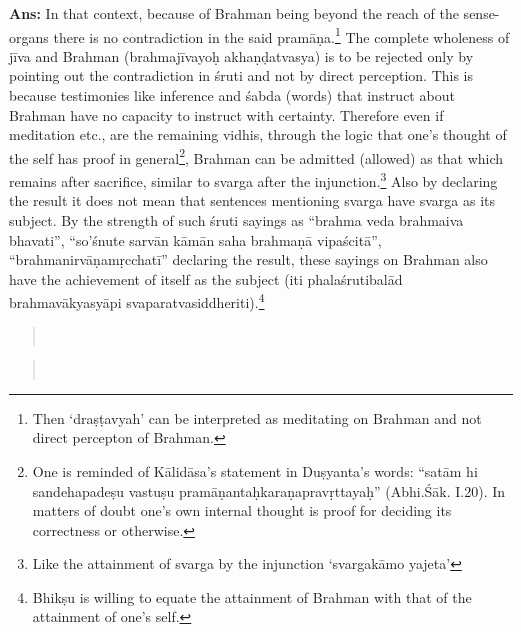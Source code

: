 \textbf{Ans:} In that context, because of Brahman being beyond the reach of the sense-organs there is no contradiction in the said pramāṇa.\footnote{Then ‘draṣṭavyah’ can be interpreted as meditating on Brahman and not direct percepton of Brahman.} The complete wholeness of jīva and Brahman (brahmajīvayoḥ akhaṇḍatvasya) is to be rejected only by pointing out the contradiction in śruti and not by direct perception. This is because testimonies like inference and śabda (words) that instruct about Brahman have no capacity to instruct with certainty. Therefore even if meditation etc., are the remaining vidhis, through the logic that one’s thought of the self has proof in general\footnote{One is reminded of Kālidāsa’s statement in Duṣyanta’s words: “satām hi sandehapadeṣu vastuṣu pramāṇantaḥkaraṇapravṛttayaḥ” (Abhi.Śāk. I.20). In matters of doubt one’s own internal thought is proof for deciding its correctness or otherwise.}, Brahman can be admitted (allowed) as that which remains after sacrifice, similar to svarga after the injunction.\footnote{Like the attainment of svarga by the injunction ‘svargakāmo yajeta’} Also by declaring the result it does not mean that sentences mentioning svarga have svarga as its subject. By the strength of such śruti sayings as “brahma veda brahmaiva bhavati”, “so’śnute sarvān kāmān saha brahmaṇā vipaścitā”, “brahmanirvāṇamṛcchatī” declaring the result, these sayings on Brahman also have the achievement of itself as the subject (iti phalaśrutibalād brahmavākyasyāpi svaparatvasiddheriti).\footnote{Bhikṣu is willing to equate the attainment of Brahman with that of the attainment of one’s self.}


\begin{verse}
\\
\end{verse}
\begin{verse}
\\
\end{verse}


